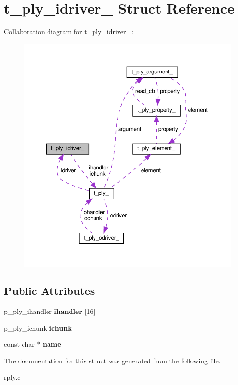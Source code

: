 \hypertarget{structt__ply__idriver__}{}\section{t\+\_\+ply\+\_\+idriver\+\_\+ Struct Reference}
\label{structt__ply__idriver__}


Collaboration diagram for t\+\_\+ply\+\_\+idriver\+\_\+\+:\nopagebreak
\begin{figure}[H]
\begin{center}
\leavevmode
\includegraphics[width=350pt]{structt__ply__idriver____coll__graph}
\end{center}
\end{figure}
\subsection*{Public Attributes}
\begin{DoxyCompactItemize}
\item 
\mbox{\label{structt__ply__idriver___afabd4f3eef6f708d9872c623f5d48324}} 
p\+\_\+ply\+\_\+ihandler {\bfseries ihandler} \mbox{[}16\mbox{]}
\item 
\mbox{\label{structt__ply__idriver___a317e387dd6c97231d081c71b5e705b28}} 
p\+\_\+ply\+\_\+ichunk {\bfseries ichunk}
\item 
\mbox{\label{structt__ply__idriver___a51009fbc3df6433214fd19a34f0aac02}} 
const char $\ast$ {\bfseries name}
\end{DoxyCompactItemize}


The documentation for this struct was generated from the following file\+:\begin{DoxyCompactItemize}
\item 
rply.\+c\end{DoxyCompactItemize}

